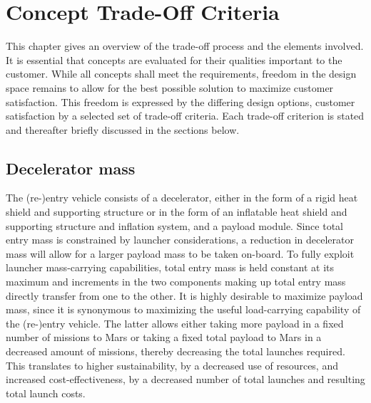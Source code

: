 \section{Concept Trade-Off Criteria}\label{ch:tradeoff}
This chapter gives an overview of the trade-off process and the elements involved. It is essential that concepts are evaluated for their qualities important to the customer. While all concepts shall meet the requirements, freedom in the design space remains to allow for the best possible solution to maximize customer satisfaction. This freedom is expressed by the differing design options, customer satisfaction by a selected set of trade-off criteria. Each trade-off criterion is stated and thereafter briefly discussed in the sections below.

\subsection{Decelerator mass}\label{subsub:decelmass}
The (re-)entry vehicle consists of a decelerator, either in the form of a rigid heat shield and supporting structure or in the form of an inflatable heat shield and supporting structure and inflation system, and a payload module. Since total entry mass is constrained by launcher considerations, a reduction in decelerator mass will allow for a larger payload mass to be taken on-board. To fully exploit launcher mass-carrying capabilities, total entry mass is held constant at its maximum and increments in the two components making up total entry mass directly transfer from one to the other. It is highly desirable to maximize payload mass, since it is synonymous to maximizing the useful load-carrying capability of the (re-)entry vehicle. The latter allows either taking more payload in a fixed number of missions to Mars or taking a fixed total payload to Mars in a decreased amount of missions, thereby decreasing the total launches required. This translates to higher sustainability, by a decreased use of resources, and increased cost-effectiveness, by a decreased number of total launches and resulting total launch costs.

